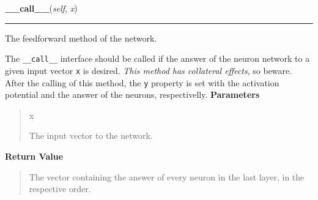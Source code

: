     \label{peach:nn:nnet:FeedForward:__call__}

    \vspace{0.5ex}

\hspace{.8\funcindent}\begin{boxedminipage}{\funcwidth}

    \raggedright \textbf{\_\_call\_\_}(\textit{self}, \textit{x})

    \vspace{-1.5ex}

    \rule{\textwidth}{0.5\fboxrule}
\setlength{\parskip}{2ex}

The feedforward method of the network.

The \texttt{\_\_call\_\_} interface should be called if the answer of the neuron
network to a given input vector \texttt{x} is desired. \emph{This method has
collateral effects}, so beware. After the calling of this method, the
\texttt{y} property is set with the activation potential and the answer of
the neurons, respectivelly.
\setlength{\parskip}{1ex}
      \textbf{Parameters}
      \vspace{-1ex}

      \begin{quote}
        \begin{Ventry}{x}

          \item[x]


The input vector to the network.
        \end{Ventry}

      \end{quote}

      \textbf{Return Value}
    \vspace{-1ex}

      \begin{quote}

The vector containing the answer of every neuron in the last layer, in
the respective order.
      \end{quote}

    \end{boxedminipage}

    \label{peach:nn:nnet:FeedForward:learn}

